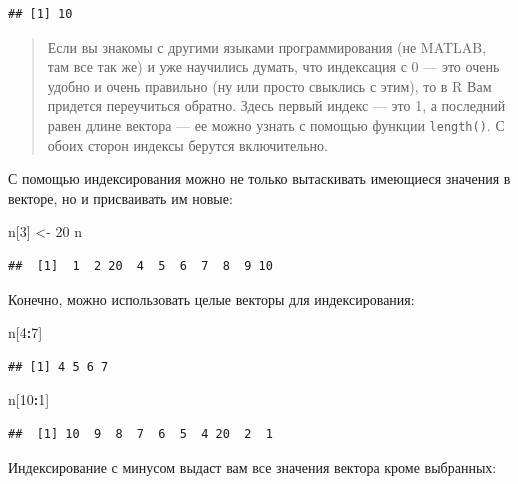 \documentclass[]{book}
\newenvironment{Shaded}{\begin{snugshade}}{\end{snugshade}}
\newcommand{\DecValTok}[1]{\textcolor[rgb]{0.00,0.00,0.81}{#1}}
\newcommand{\StringTok}[1]{\textcolor[rgb]{0.31,0.60,0.02}{#1}}
\newcommand{\OperatorTok}[1]{\textcolor[rgb]{0.81,0.36,0.00}{\textbf{#1}}}
\newcommand{\NormalTok}[1]{#1}
\begin{document}
\begin{verbatim}
## [1] 10
\end{verbatim}

\begin{quote}
Если вы знакомы с другими языками программирования (не MATLAB, там все
так же) и уже научились думать, что индексация с 0 --- это очень удобно
и очень правильно (ну или просто свыклись с этим), то в R Вам придется
переучиться обратно. Здесь первый индекс --- это 1, а последний равен
длине вектора --- ее можно узнать с помощью функции \texttt{length()}. С
обоих сторон индексы берутся включительно.
\end{quote}

С помощью индексирования можно не только вытаскивать имеющиеся значения
в векторе, но и присваивать им новые:

\begin{Shaded}
\begin{Highlighting}[]
\NormalTok{n[}\DecValTok{3}\NormalTok{] <-}\StringTok{ }\DecValTok{20}
\NormalTok{n}
\end{Highlighting}
\end{Shaded}

\begin{verbatim}
##  [1]  1  2 20  4  5  6  7  8  9 10
\end{verbatim}

Конечно, можно использовать целые векторы для индексирования:

\begin{Shaded}
\begin{Highlighting}[]
\NormalTok{n[}\DecValTok{4}\OperatorTok{:}\DecValTok{7}\NormalTok{]}
\end{Highlighting}
\end{Shaded}

\begin{verbatim}
## [1] 4 5 6 7
\end{verbatim}

\begin{Shaded}
\begin{Highlighting}[]
\NormalTok{n[}\DecValTok{10}\OperatorTok{:}\DecValTok{1}\NormalTok{]}
\end{Highlighting}
\end{Shaded}

\begin{verbatim}
##  [1] 10  9  8  7  6  5  4 20  2  1
\end{verbatim}

Индексирование с минусом выдаст вам все значения вектора кроме
выбранных:
\end{document}
